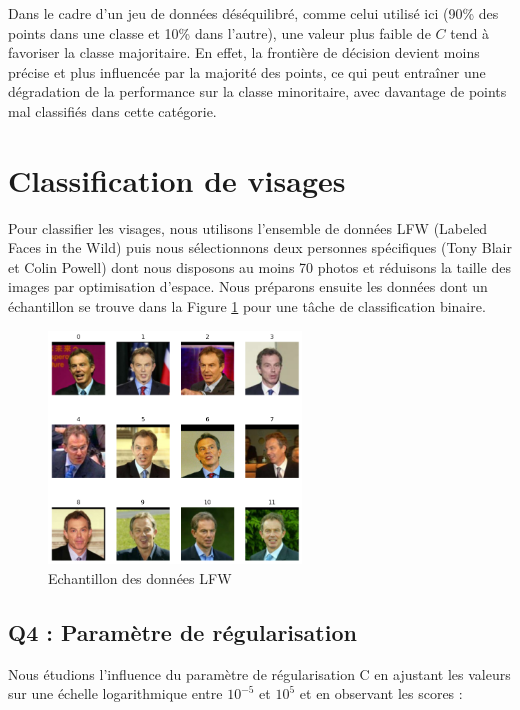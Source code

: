 \documentclass{scrartcl}
\begin{document}
Dans le cadre d'un jeu de données déséquilibré, comme celui utilisé ici (90\% des points dans une classe et 10\% dans l'autre), une valeur plus faible de $C$ tend à favoriser la classe majoritaire. En effet, la frontière de décision devient moins précise et plus influencée par la majorité des points, ce qui peut entraîner une dégradation de la performance sur la classe minoritaire, avec davantage de points mal classifiés dans cette catégorie.

\section{Classification de visages}

\hspace{7pt} Pour classifier les visages, nous utilisons l'ensemble de données LFW (Labeled Faces in the Wild) puis nous sélectionnons deux personnes spécifiques (Tony Blair et Colin Powell) dont nous disposons au moins 70 photos et réduisons la taille des images par optimisation d'espace. Nous préparons ensuite les données dont un échantillon se trouve dans la Figure \ref{fig:lfw} pour une tâche de classification binaire.

\begin{figure}[H]
    \centering
    \includegraphics[width=0.6\textwidth]{../images/TB-CP.png}
    \caption{\centering Echantillon des données LFW} 
    \label{fig:lfw}
\end{figure}

\subsection{Q4 : Paramètre de régularisation}

\hspace{7pt} Nous étudions l'influence du paramètre de régularisation C en ajustant les valeurs sur une échelle logarithmique entre $10^{-5}$ et $10^5$ et en observant les scores :
\end{document}
